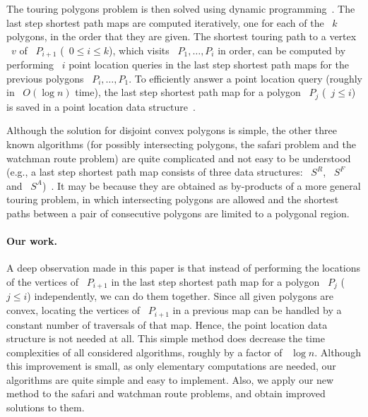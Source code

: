 \documentclass[11pt]{article}
\begin{document}
The touring polygons problem is then solved using dynamic programming~\cite{ref6}.
The last step shortest path maps are computed iteratively, one for each of the ~\(k\) polygons, in the order that they are given.
The shortest touring path to a vertex ~\(v\) of ~\(P_{i+1}\) (~\(0 \le i \le k\)), which visits ~\(P_1, \ldots, P_i\) in order, can be computed by performing ~\(i\) point location queries in the last step shortest path maps for the previous polygons ~\(P_i, \ldots, P_1\).
To efficiently answer a point location query (roughly in ~\(O(\log n)\) time), the last step shortest path map for a polygon ~\(P_j\) (~\(j \le i\)) is saved in a point location data structure~\cite{ref6}.

Although the solution for disjoint convex polygons is simple, the other three known algorithms (for possibly intersecting polygons, the safari problem and the watchman route problem) are quite complicated and not easy to be understood (e.g., a last step shortest path map consists of three data structures: ~\(S^R\), ~\(S^F\) and ~\(S^A\))~\cite{ref6}.
It may be because they are obtained as by-products of a more general touring problem, in which intersecting polygons are allowed and the shortest paths between a pair of consecutive polygons are limited to a polygonal region.

\paragraph{Our work.}
A deep observation made in this paper is that instead of performing the locations of the vertices of ~\(P_{i+1}\) in the last step shortest path map for a polygon ~\(P_j\) (~\(j \le i\)) independently, we can do them together.
Since all given polygons are convex, locating the vertices of ~\(P_{i+1}\) in a previous map can be handled by a constant number of traversals of that map.
Hence, the point location data structure is not needed at all.
This simple method does decrease the time complexities of all considered algorithms, roughly by a factor of ~\(\log n\).
Although this improvement is small, as only elementary computations are needed, our algorithms are quite simple and easy to implement.
Also, we apply our new method to the safari and watchman route problems, and obtain improved solutions to them.
\end{document}
